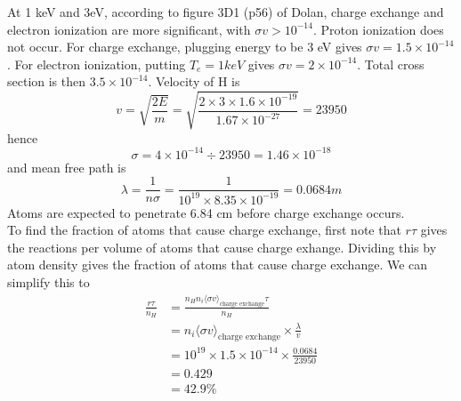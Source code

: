 \documentclass[answers]{exam}
\begin{document}
\begin{questions}

\begin{solution}
    At 1 keV and 3eV, according to figure 3D1 (p56) of Dolan, charge exchange and electron ionization are more significant, with $\sigma v > 10^{-14}$. Proton ionization does not occur. For charge exchange, plugging energy to be 3 eV gives $\sigma v = 1.5 \times 10^{-14}$. For electron ionization, putting $T_e = 1\unit{keV}$ gives $\sigma v = 2 \times 10^{-14}$. Total cross section is then $3.5 \times 10^{-14}$.
    Velocity of H is
    $$v = \sqrt{\frac{2E}{m}} = \sqrt{\frac{2\times 3 \times 1.6 \times 10^{-19}}{1.67 \times 10^{-27}}} = 23950$$
    hence
    $$\sigma = 4 \times 10^{-14} \div 23950 = 1.46 \times 10^{-18}$$
    and mean free path is
    $$\lambda = \frac{1}{n\sigma} = \frac{1}{10^{19}\times 8.35 \times 10^{-19}} = 0.0684 \unit{m}$$
    Atoms are expected to penetrate 6.84 cm before charge exchange occurs. \\
    To find the fraction of atoms that cause charge exchange, first note that $r\tau$ gives the reactions per volume of atoms that cause charge exhange. Dividing this by atom density gives the fraction of atoms that cause charge exchange. We can simplify this to
    \begin{align*} 
        \frac{r\tau}{n_H} &= \frac{n_Hn_i\langle\sigma v\rangle_{\text{charge exchange}}\tau}{n_H} \\
                          &= n_i\langle\sigma v\rangle_{\text{charge exchange}}\times\frac{\lambda}{v} \\
                          &= 10^{19} \times 1.5 \times 10^{-14} \times \frac{0.0684}{23950} \\
                          &= 0.429 \\
                          &= 42.9\%
    \end{align*}
\end{solution}



\end{questions}
\end{document}
